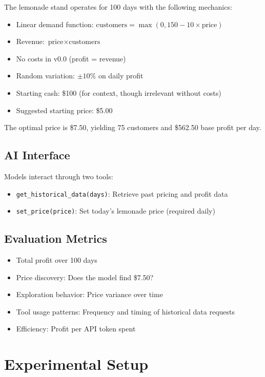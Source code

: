 \documentclass[11pt]{article}
\begin{document}
The lemonade stand operates for 100 days with the following mechanics:
\begin{itemize}
    \item Linear demand function: $\text{customers} = \max(0, 150 - 10 \times \text{price})$
    \item Revenue: $\text{price} \times \text{customers}$
    \item No costs in v0.0 (profit = revenue)
    \item Random variation: $\pm 10\%$ on daily profit
    \item Starting cash: \$100 (for context, though irrelevant without costs)
    \item Suggested starting price: \$5.00
\end{itemize}

The optimal price is \$7.50, yielding 75 customers and \$562.50 base profit per day.

\subsection{AI Interface}

Models interact through two tools:
\begin{itemize}
    \item \texttt{get\_historical\_data(days)}: Retrieve past pricing and profit data
    \item \texttt{set\_price(price)}: Set today's lemonade price (required daily)
\end{itemize}

\subsection{Evaluation Metrics}

\begin{itemize}
    \item Total profit over 100 days
    \item Price discovery: Does the model find \$7.50?
    \item Exploration behavior: Price variance over time
    \item Tool usage patterns: Frequency and timing of historical data requests
    \item Efficiency: Profit per API token spent
\end{itemize}

\section{Experimental Setup}
\end{document}
